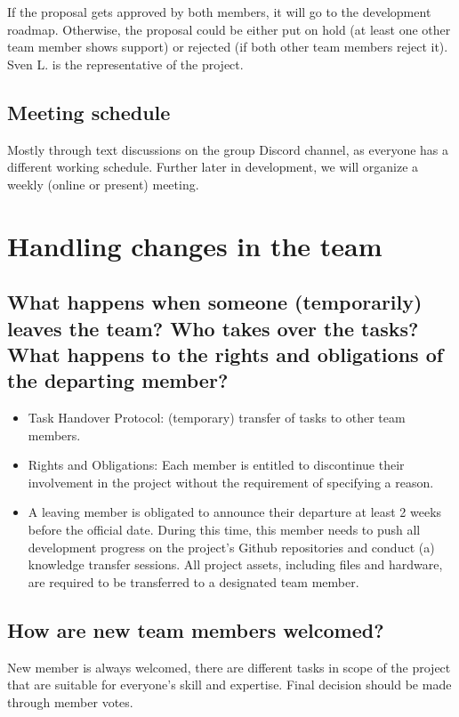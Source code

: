 \documentclass{article}
\begin{document}
If the proposal gets approved by both members, it will go to the development roadmap.
Otherwise, the proposal could be either put on hold (at least one other team member shows support) or rejected (if both other team members reject it).\\

Sven L. is the representative of the project.

\subsection{Meeting schedule}
Mostly through text discussions on the group Discord channel, as everyone has a different working schedule.
Further later in development, we will organize a weekly (online or present) meeting.

\section{Handling changes in the team}
\subsection{What happens when someone (temporarily) leaves the team? Who takes over the tasks? What happens to the rights and obligations of the departing member?}
\begin{itemize}
    \item Task Handover Protocol: (temporary) transfer of tasks to other team members. 
    \item Rights and Obligations: Each member is entitled to discontinue their involvement in the project without the requirement of specifying a reason.
    \item A leaving member is obligated to announce their departure at least 2 weeks before the official date. During this time, this member needs to push all development progress on the project's Github repositories and conduct (a) knowledge transfer sessions. All project assets, including files and hardware, are required to be transferred to a designated team member.
\end{itemize}

\subsection{How are new team members welcomed?}
New member is always welcomed, there are different tasks in scope of the project that are suitable for everyone's skill and expertise.
Final decision should be made through member votes.
\end{document}
